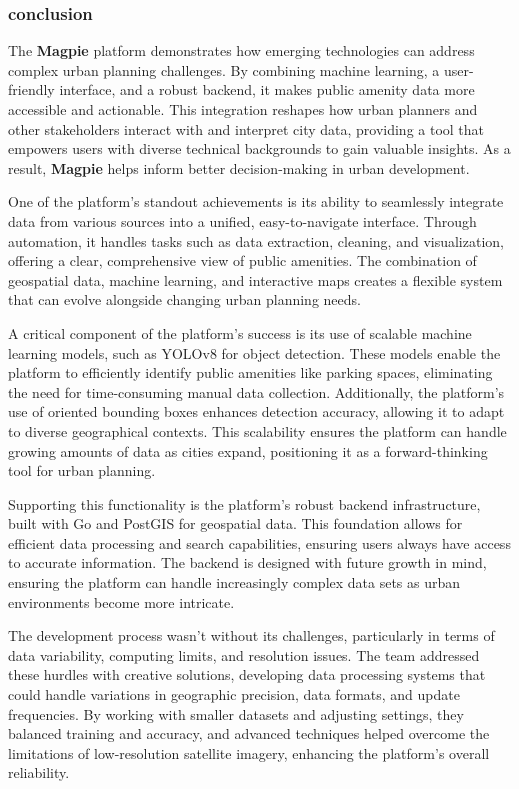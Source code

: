 \newpage{}

\subsubsection{conclusion}

The \textbf{Magpie} platform demonstrates how emerging technologies can address complex urban planning challenges. By combining machine learning, a user{-}friendly interface, and a robust backend, it makes public amenity data more accessible and actionable. This integration reshapes how urban planners and other stakeholders interact with and interpret city data, providing a tool that empowers users with diverse technical backgrounds to gain valuable insights. As a result, \textbf{Magpie} helps inform better decision{-}making in urban development.

One of the platform's standout achievements is its ability to seamlessly integrate data from various sources into a unified, easy{-}to{-}navigate interface. Through automation, it handles tasks such as data extraction, cleaning, and visualization, offering a clear, comprehensive view of public amenities. The combination of geospatial data, machine learning, and interactive maps creates a flexible system that can evolve alongside changing urban planning needs.

A critical component of the platform's success is its use of scalable machine learning models, such as YOLOv8 for object detection. These models enable the platform to efficiently identify public amenities like parking spaces, eliminating the need for time{-}consuming manual data collection. Additionally, the platform's use of oriented bounding boxes enhances detection accuracy, allowing it to adapt to diverse geographical contexts. This scalability ensures the platform can handle growing amounts of data as cities expand, positioning it as a forward{-}thinking tool for urban planning.

Supporting this functionality is the platform’s robust backend infrastructure, built with Go and PostGIS for geospatial data. This foundation allows for efficient data processing and search capabilities, ensuring users always have access to accurate information. The backend is designed with future growth in mind, ensuring the platform can handle increasingly complex data sets as urban environments become more intricate.

The development process wasn’t without its challenges, particularly in terms of data variability, computing limits, and resolution issues. The team addressed these hurdles with creative solutions, developing data processing systems that could handle variations in geographic precision, data formats, and update frequencies. By working with smaller datasets and adjusting settings, they balanced training and accuracy, and advanced techniques helped overcome the limitations of low{-}resolution satellite imagery, enhancing the platform's overall reliability.

